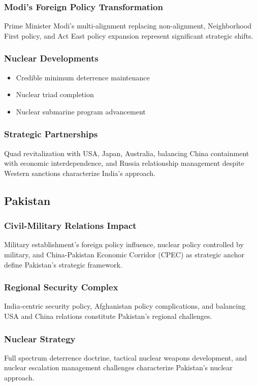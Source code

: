 \documentclass[a4paper, 11pt]{article}
\begin{document}
\subsubsection{Modi's Foreign Policy Transformation}
Prime Minister Modi's multi-alignment replacing non-alignment, Neighborhood First policy, and Act East policy expansion represent significant strategic shifts.

\subsubsection{Nuclear Developments}
\begin{itemize}
	\item Credible minimum deterrence maintenance
	\item Nuclear triad completion
	\item Nuclear submarine program advancement
\end{itemize}

\subsubsection{Strategic Partnerships}
Quad revitalization with USA, Japan, Australia, balancing China containment with economic interdependence, and Russia relationship management despite Western sanctions characterize India's approach.

\subsection{Pakistan}

\subsubsection{Civil-Military Relations Impact}
Military establishment's foreign policy influence, nuclear policy controlled by military, and China-Pakistan Economic Corridor (CPEC) as strategic anchor define Pakistan's strategic framework.

\subsubsection{Regional Security Complex}
India-centric security policy, Afghanistan policy complications, and balancing USA and China relations constitute Pakistan's regional challenges.

\subsubsection{Nuclear Strategy}
Full spectrum deterrence doctrine, tactical nuclear weapons development, and nuclear escalation management challenges characterize Pakistan's nuclear approach.
\end{document}
